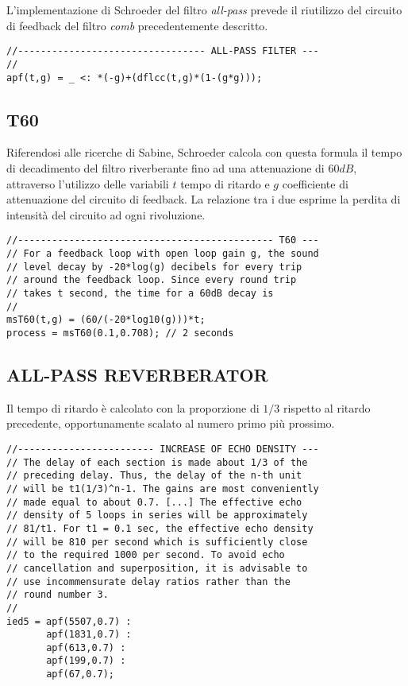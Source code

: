 L'implementazione di Schroeder del filtro \emph{all-pass} prevede il riutilizzo
del circuito di feedback del filtro \emph{comb} precedentemente descritto.

\begin{lstlisting}
//--------------------------------- ALL-PASS FILTER ---
//
apf(t,g) = _ <: *(-g)+(dflcc(t,g)*(1-(g*g)));
\end{lstlisting}


\subsection*{T60}

Riferendosi alle ricerche di Sabine, Schroeder calcola con questa formula il
tempo di decadimento del filtro riverberante fino ad una attenuazione di $60dB$,
attraverso l'utilizzo delle variabili $t$ tempo di ritardo e $g$ coefficiente
di attenuazione del circuito di feedback. La relazione tra i due esprime la
perdita di intensità del circuito ad ogni rivoluzione.

\begin{lstlisting}
//--------------------------------------------- T60 ---
// For a feedback loop with open loop gain g, the sound
// level decay by -20*log(g) decibels for every trip
// around the feedback loop. Since every round trip
// takes t second, the time for a 60dB decay is
//
msT60(t,g) = (60/(-20*log10(g)))*t;
process = msT60(0.1,0.708); // 2 seconds
\end{lstlisting}

\subsection*{ALL-PASS REVERBERATOR}

Il tempo di ritardo è calcolato con la proporzione di $1/3$ rispetto al
ritardo precedente, opportunamente scalato al numero primo più prossimo.

\begin{lstlisting}
//------------------------ INCREASE OF ECHO DENSITY ---
// The delay of each section is made about 1/3 of the
// preceding delay. Thus, the delay of the n-th unit
// will be t1(1/3)^n-1. The gains are most conveniently
// made equal to about 0.7. [...] The effective echo
// density of 5 loops in series will be approximately
// 81/t1. For t1 = 0.1 sec, the effective echo density
// will be 810 per second which is sufficiently close
// to the required 1000 per second. To avoid echo
// cancellation and superposition, it is advisable to
// use incommensurate delay ratios rather than the
// round number 3.
//
ied5 = apf(5507,0.7) :
       apf(1831,0.7) :
       apf(613,0.7) :
       apf(199,0.7) :
       apf(67,0.7);
\end{lstlisting}

